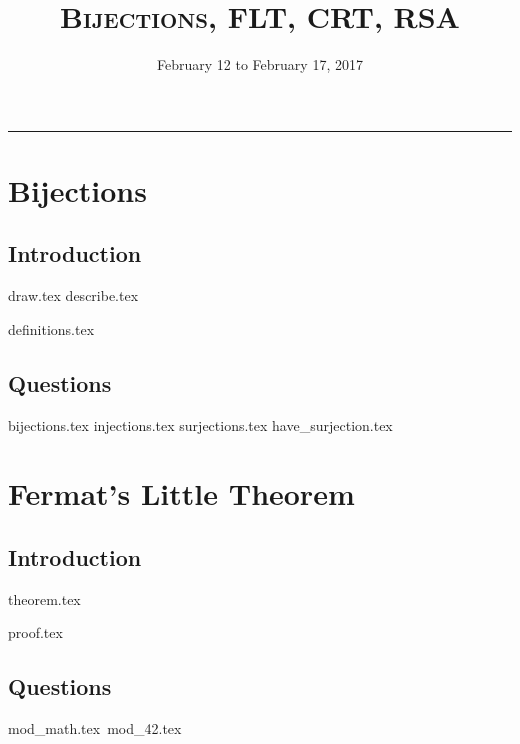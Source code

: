 \documentclass{exam}
\title{\textsc{Bijections, FLT, CRT, RSA}}
\date{February 12 to February 17, 2017}
\begin{document}
\maketitle
\rule{\textwidth}{0.15em}
\fontsize{12}{15}\selectfont
\thispagestyle{empty}

\section{Bijections}
\subsection{Introduction}
\begin{questions}
{draw.tex}
{describe.tex}
\end{questions}
{definitions.tex}
\subsection{Questions}
\begin{questions}
{bijections.tex}
{injections.tex}
{surjections.tex}
{have_surjection.tex}
\end{questions}

\section{Fermat's Little Theorem}
\subsection{Introduction}
{theorem.tex}
\begin{questions}
{proof.tex}
\end{questions}
\subsection{Questions}
\begin{questions}
{mod_math.tex}\
{mod_42.tex}
\end{questions}
\end{document}
